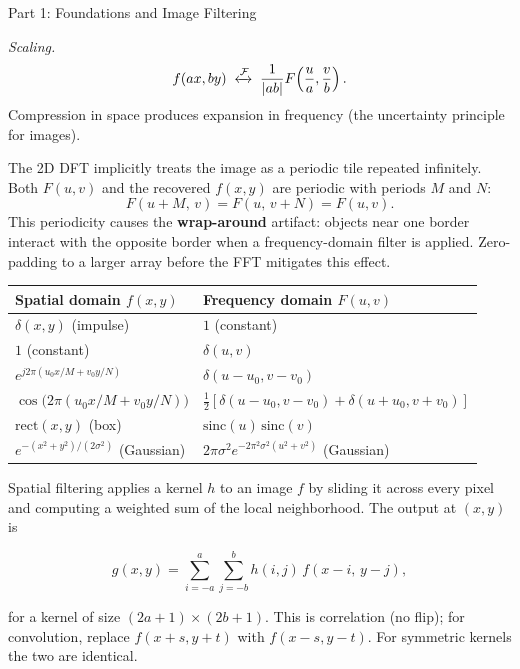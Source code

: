 \documentclass[letterpaper]{article}
\begin{document}
\begin{notes}{Part 1: Foundations and Image Filtering}
\begin{enumerate}
    \textit{Scaling.}
    $$f(ax, by) \;\xleftrightarrow{\mathcal{F}}\; \frac{1}{|ab|}F\!\left(\frac{u}{a},\frac{v}{b}\right).$$
    Compression in space produces expansion in frequency (the uncertainty principle for images).
\end{enumerate}




The 2D DFT implicitly treats the image as a periodic tile repeated infinitely. Both $F(u,v)$ and the recovered $f(x,y)$ are periodic with periods $M$ and $N$:
$$F(u+M,\, v) = F(u,\, v+N) = F(u,v).$$
This periodicity causes the \textbf{wrap-around} artifact: objects near one border interact with the opposite border when a frequency-domain filter is applied. Zero-padding to a larger array before the FFT mitigates this effect.



\begin{center}
\begin{tabular}{@{}ll@{}}
\toprule
Spatial domain $f(x,y)$ & Frequency domain $F(u,v)$ \\
\midrule
$\delta(x,y)$ (impulse) & $1$ (constant) \\
$1$ (constant) & $\delta(u,v)$ \\
$e^{j2\pi(u_0x/M+v_0y/N)}$ & $\delta(u-u_0,v-v_0)$ \\
$\cos\bigl(2\pi(u_0x/M+v_0y/N)\bigr)$ & $\tfrac{1}{2}[\delta(u\!-\!u_0,v\!-\!v_0)+\delta(u\!+\!u_0,v\!+\!v_0)]$ \\
$\text{rect}(x,y)$ (box) & $\text{sinc}(u)\,\text{sinc}(v)$ \\
$e^{-(x^2+y^2)/(2\sigma^2)}$ (Gaussian) & $2\pi\sigma^2 e^{-2\pi^2\sigma^2(u^2+v^2)}$ (Gaussian) \\
\bottomrule
\end{tabular}
\end{center}


\columnbreaknofill



Spatial filtering applies a kernel $h$ to an image $f$ by sliding it across every pixel and computing a weighted sum of the local neighborhood. The output at $(x,y)$ is

$$g(x,y) = \sum_{i=-a}^{a}\sum_{j=-b}^{b} h(i,j)\,f(x-i,\,y-j),$$

for a kernel of size $(2a+1)\times(2b+1)$. This is correlation (no flip); for convolution, replace $f(x+s, y+t)$ with $f(x-s, y-t)$. For symmetric kernels the two are identical.\\


\end{notes}
\end{document}
